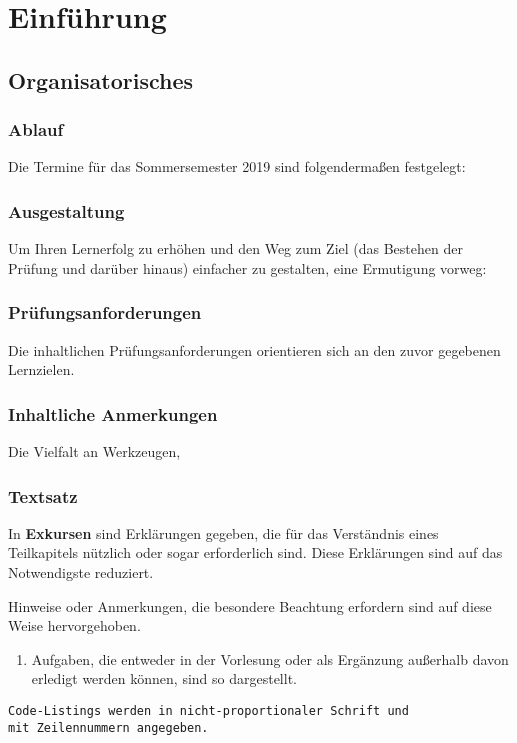 
\chapter{Einführung}

\section{Organisatorisches}

\subsection{Ablauf}

Die Termine für das Sommersemester 2019 sind folgendermaßen festgelegt:

\subsection{Ausgestaltung}

Um Ihren Lernerfolg zu erhöhen und den Weg zum Ziel (das Bestehen der Prüfung und darüber hinaus) einfacher zu gestalten, eine Ermutigung vorweg:


\subsection{Prüfungsanforderungen}

Die inhaltlichen Prüfungsanforderungen orientieren sich an den zuvor gegebenen Lernzielen. 

\subsection{Inhaltliche Anmerkungen}

Die Vielfalt an Werkzeugen, 

\subsection{Textsatz}

\begin{hintbox*}
In \textbf{Exkursen} sind Erklärungen gegeben, die für das Verständnis eines Teilkapitels nützlich oder sogar erforderlich sind. Diese Erklärungen sind auf das Notwendigste reduziert.
\end{hintbox*}

\begin{hintbox}
	Hinweise oder Anmerkungen, die besondere Beachtung erfordern sind auf diese Weise hervorgehoben.
\end{hintbox}

\begin{enumerate}[label=\taskitemlabel,leftmargin=35pt]
\item Aufgaben, die entweder in der Vorlesung oder als Ergänzung außerhalb davon erledigt werden können, sind so dargestellt.
\end{enumerate}

\begin{lstlisting}
Code-Listings werden in nicht-proportionaler Schrift und 
mit Zeilennummern angegeben.
\end{lstlisting}